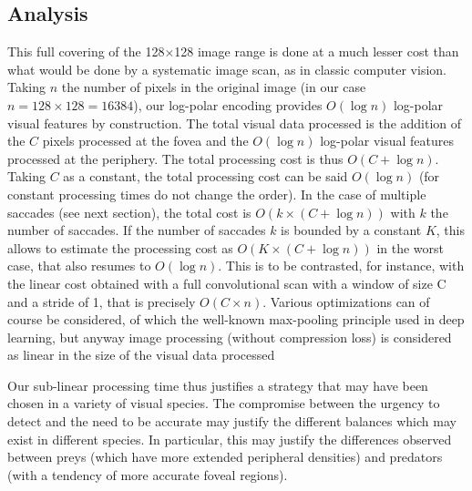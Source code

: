 \subsection{Analysis}
This full covering of the 128$\times$128 image range is done at a much lesser cost than what would be done by a systematic image scan, as in classic computer vision. Taking $n$ the number of pixels in the original image (in our case $n=128\times128=16384$), our log-polar encoding provides $O(\log n)$ log-polar visual features by construction. The total visual data processed is the addition of the $C$ pixels processed at the fovea and the $O(\log n)$ log-polar visual features processed at the periphery. The total processing cost is thus $O(C+\log n)$. Taking $C$ as a constant, the total processing cost can be said $O(\log n)$ (for constant processing times do not change the order). 
In the case of multiple saccades (see next section), the total cost is $O(k\times(C+\log n))$ with $k$ the number of saccades. If the number of saccades $k$ is bounded by a constant $K$, this allows to estimate the processing cost as $O(K\times(C+\log n))$ in the worst case, that also resumes to $O(\log n)$.
This is to be contrasted, for instance, with the linear cost obtained with a full convolutional scan with a window of size C and a stride of 1, that is precisely $O(C\times n)$. Various optimizations can of course be considered, of which the well-known max-pooling principle used in deep learning, but anyway
image processing (without compression loss) is considered as linear in the size of the visual data processed \cite{strengert2006pyramid}

Our sub-linear processing time thus justifies a strategy that may have been chosen in a variety of visual species. The compromise between the urgency to detect and the need to be accurate may justify the different balances which may exist in different species. In particular, this may justify the differences observed between preys (which have more extended peripheral densities) and predators (with a tendency of more accurate foveal regions). %

%
